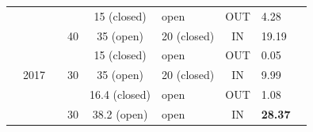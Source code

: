 \documentclass[encoding=utf8,british]{tumphthesis}
\begin{document}
\begin{table}[H]
\begin{tabular}{|c|c|c|l|c|l|c|l|r|}
\rowcolor[HTML]{EFEFEF} 
\cellcolor[HTML]{EFEFEF}                       & \cellcolor[HTML]{EFEFEF}                       &                                                                    & \cellcolor[HTML]{EFEFEF}                                         & 15 (closed)                       & open                                & OUT                        & 4.28                          \\
\rowcolor[HTML]{EFEFEF} 
\cellcolor[HTML]{EFEFEF}                       & \cellcolor[HTML]{EFEFEF}                       &                                                                    & \multirow{-2}{*}{\cellcolor[HTML]{EFEFEF}40}                     & \cellcolor[HTML]{9FC5E8}35 (open) & \cellcolor[HTML]{9FC5E8}20 (closed) & \cellcolor[HTML]{9FC5E8}IN & \cellcolor[HTML]{9FC5E8}19.19 \\
\rowcolor[HTML]{EFEFEF} 
\cellcolor[HTML]{EFEFEF}                       & \cellcolor[HTML]{EFEFEF}                       & \multicolumn{1}{|c|}{\cellcolor[HTML]{9FC5E8}}                       & \multicolumn{1}{|c|}{\cellcolor[HTML]{9FC5E8}}                     & 15 (closed)                       & open                                & OUT                        & 0.05                          \\
\rowcolor[HTML]{9FC5E8} 
\cellcolor[HTML]{EFEFEF}                       & \multirow{-4}{*}{\cellcolor[HTML]{EFEFEF}2017} & \multicolumn{1}{|c|}{\cellcolor[HTML]{9FC5E8}}                       & \multicolumn{1}{|c|}{\multirow{-2}{*}{\cellcolor[HTML]{9FC5E8}30}} & 35 (open)                         & 20 (closed)                         & IN                         & 9.99                          \\
\rowcolor[HTML]{EFEFEF} 
\cellcolor[HTML]{EFEFEF}                       & \cellcolor[HTML]{9FC5E8}                       &                                                                    & \cellcolor[HTML]{EFEFEF}                                         & 16.4 (closed)                     & open                                & OUT                        & 1.08                          \\
\rowcolor[HTML]{9FC5E8} 
\cellcolor[HTML]{EFEFEF}                       & \cellcolor[HTML]{9FC5E8}                       & \cellcolor[HTML]{EFEFEF}                                           & \multirow{-2}{*}{\cellcolor[HTML]{EFEFEF}30}                     & 38.2 (open)                       & open                                & IN                         & \textbf{28.37}                \\

\end{tabular}
\end{table}
\end{document}
